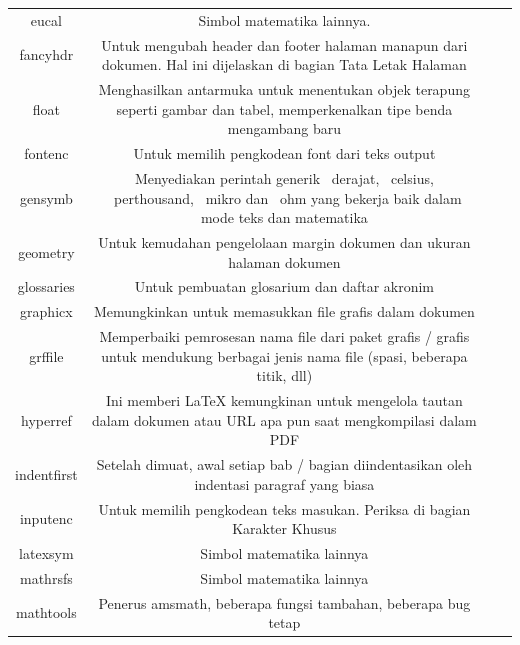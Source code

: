 \begin{table}[ht]
\begin{tabular}{cccc}
		eucal&Simbol matematika lainnya.&\\
		fancyhdr&Untuk mengubah header dan footer halaman manapun dari dokumen. Hal ini dijelaskan di bagian Tata Letak Halaman&\\
		float&Menghasilkan antarmuka untuk menentukan objek terapung seperti gambar dan tabel, memperkenalkan tipe benda mengambang baru &\\
		fontenc&Untuk memilih pengkodean font dari teks output&\\
		gensymb&Menyediakan perintah generik \ derajat, \ celsius, \ perthousand, \ mikro dan \ ohm yang bekerja baik dalam mode teks dan matematika&\\
		geometry&Untuk kemudahan pengelolaan margin dokumen dan ukuran halaman dokumen&\\
		glossaries&Untuk pembuatan glosarium dan daftar akronim&\\
		graphicx&Memungkinkan untuk memasukkan file grafis dalam dokumen&\\
		grffile&Memperbaiki pemrosesan nama file dari paket grafis / grafis untuk mendukung berbagai jenis nama file (spasi, beberapa titik, dll)&\\
		hyperref&Ini memberi LaTeX kemungkinan untuk mengelola tautan dalam dokumen atau URL apa pun saat mengkompilasi dalam PDF&\\
		indentfirst&Setelah dimuat, awal setiap bab / bagian diindentasikan oleh indentasi paragraf yang biasa&\\
		inputenc&Untuk memilih pengkodean teks masukan. Periksa di bagian Karakter Khusus&\\
		latexsym&Simbol matematika lainnya&\\
			mathrsfs&Simbol matematika lainnya&\\
		mathtools&Penerus amsmath, beberapa fungsi tambahan, beberapa bug tetap&\\
	\end{tabular}
\end{table}
